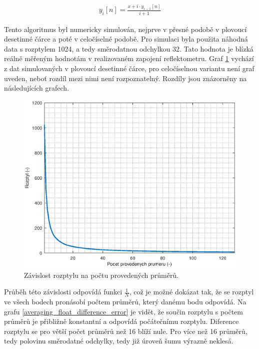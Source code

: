 \begin{equation}
\begin{gathered}
	y_i[n]=	\frac{x+i \cdot y_{i-1}[n]}{i+1}
\end{gathered}
\end{equation}

Tento algoritmus byl numericky simulován, nejprve v přesné podobě v plovoucí desetinné čárce a poté v celočíselné podobě. Pro simulaci byla použita náhodná data s rozptylem 1024, a tedy směrodatnou odchylkou 32. Tato hodnota je blízká reálně měřeným hodnotám v realizovaném zapojení reflektometru. Graf \ref{averaging_variance} vychází z dat simulovaných v plovoucí desetinné čárce, pro celočíselnou variantu není graf uveden, neboť rozdíl mezi nimi není rozpoznatelný. Rozdíly jsou znázorněny na následujících grafech.

\begin{figure}[htbp]
\includegraphics[width=\textwidth,keepaspectratio]{images/averaging_float_variance.eps}\caption{Závislost rozptylu na počtu provedených průměrů.}\label{averaging_variance}
\end{figure}	

Průběh této závislosti odpovídá funkci $\frac{1}{N}$, což je možné dokázat tak, že se rozptyl ve všech bodech pronásobí počtem průměrů, který danému bodu odpovídá. Na grafu \ref{averaging_float_difference_error} je vidět, že součin rozptylu s počtem průměrů je přibližně konstantní a odpovídá počátečnímu rozptylu. Diference rozptylu se pro větší počet průměrů než 16 blíží nule. Pro více než 16 průměrů, tedy polovinu směrodatné odchylky, tedy již úroveň šumu výrazně neklesá.

